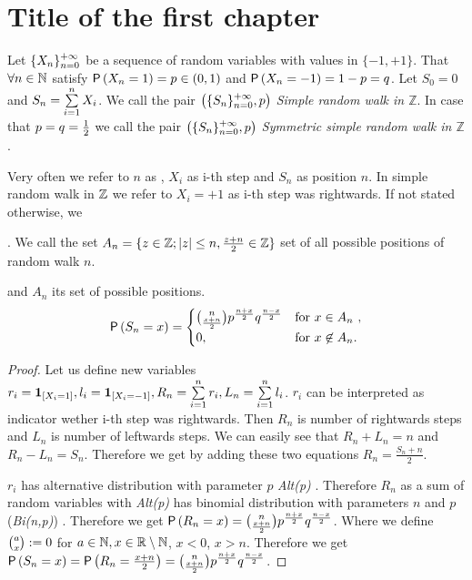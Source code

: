 \chapter{Title of the first chapter}

\begin{defn}\label{defn-simple_random_walk_Z}
 Let $\{X_n\}_{n=0}^{+\infty}$ be a sequence of \iid random variables with values in $\{ -1, +1\}$. That $\forall n \in \mathbb{N}$ satisfy $\operatorname{\textsf{P}} \left( X_n=1 \right) =p \in \left( 0,1 \right) $ and $\operatorname{\textsf{P}} \left( X_n=-1 \right) =1-p=q$. Let $S_0=0$ and $S_n=\suma[i][1][n]X_i$. We call the pair $ \left( \{S_n\}_{n=0}^{+\infty}, p \right) $ \emph{Simple random walk in $\mathbb{Z}$}. In case that $p=q=\frac{1}{2} $ we call the pair $ \left( \{S_n\}_{n=0}^{+\infty}, p \right) $ \emph{Symmetric simple random walk in $\mathbb{Z}$}.
\end{defn}

\begin{rem}
 Very often we refer to $n$ as \Time, $X_i$ as i-th step and $S_n$ as position \intime $n$. In simple random walk in $\mathbb{Z}$ we refer to $X_i=+1$ as i-th step was rightwards. If not stated otherwise, we
\end{rem}

\begin{defn}\label{defn-set_all_possible_values}
 \Lrw. We call the set $A_n=\{z \in \mathbb{Z}; \left|{z}\right|\leq n, \frac{z+n}{2}\in \mathbb{Z} \}$ set of all possible positions of random walk \rw \intime $n$.
\end{defn}

\begin{thm}\label{thm-probability_position_time}
 \Lrw and $A_n$ its set of possible positions.
 \[
 \operatorname{\textsf{P}} \left( S_n=x \right) =
 \begin{cases}
 \binom{n}{\frac{x+n}{2}}p^{\frac{n+x}{2}}q^{\frac{n-x}{2}} & \text{for $x \in A_n$ },\\
 0, & \text{for $x \not\in A_n$}.
 \end{cases}
 \]
\end{thm}
\begin{proof}
 Let us define new variables $r_i=\indikator{X_i=1}, l_i=\indikator{X_i=-1}, R_n=\suma r_i, L_n=\suma l_i$. $r_i$ can be interpreted as indicator wether i-th step was rightwards. Then $R_n$ is number of rightwards steps and $L_n$ is number of leftwards steps. We can easily see that $R_n+L_n=n$ and $R_n-L_n=S_n$. Therefore we get by adding these two equations $R_n=\frac{S_n+n}{2}.$

 $r_i$ has alternative distribution with parameter $p$ \textit{Alt(p)} . Therefore $R_n$ as a sum of \iid random variables with \textit{Alt(p)} has binomial distribution with parameters $n$ and $p$ (\textit{Bi(n,p)}) . Therefore we get $\operatorname{\textsf{P}} \left(R_n=x \right) =\binom{n}{\frac{x+n}{2}}p^{\frac{n+x}{2}}q^{\frac{n-x}{2}}$. Where we define $\binom{a}{x}:= 0$ for $a \in \mathbb{N}, x\in \mathbb{R} \setminus \mathbb{N}$, $x<0$, $x>n$. Therefore we get $\operatorname{\textsf{P}} \left( S_n=x \right) =\operatorname{\textsf{P}}\left( R_n=\frac{x+n}{2} \right) = \binom{n}{\frac{x+n}{2}}p^{\frac{n+x}{2}}q^{\frac{n-x}{2}}$.
\end{proof}



